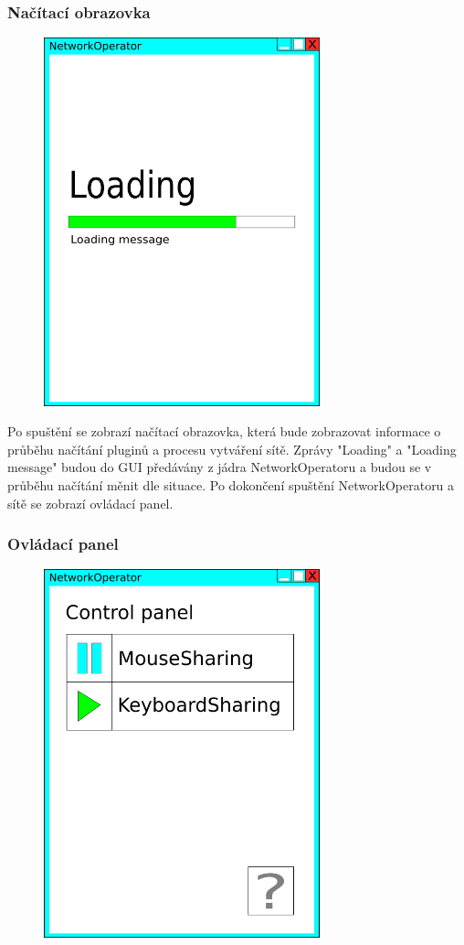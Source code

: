 \documentclass[12pt]{article}
\begin{document}
\subsubsection{Načítací obrazovka}
\begin{figure}[H]
\includegraphics[width=8cm]{gui1-loading.png}
\centering
\end{figure}

Po spuštění se zobrazí načítací obrazovka, která bude zobrazovat informace o průběhu načítání pluginů a procesu vytváření sítě. Zprávy "Loading" a "Loading message" budou do GUI předávány z jádra NetworkOperatoru a budou se v průběhu načítání měnit dle situace. Po dokončení spuštění NetworkOperatoru a sítě se zobrazí ovládací panel. 

\subsubsection{Ovládací panel}
\begin{figure}[H]
\includegraphics[width=8cm]{gui2-control-panel.png}
\centering
\end{figure}
\end{document}
